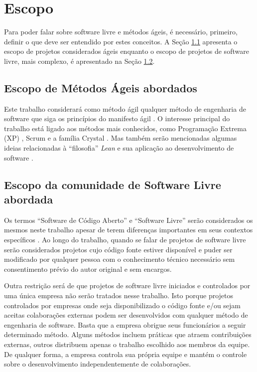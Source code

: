 \chapter{Escopo}
\label{cap:escopo}

Para poder falar sobre software livre e métodos ágeis, é necessário,
primeiro, definir o que deve ser entendido por estes conceitos. A
Seção \ref{sec:agile-def} apresenta o escopo de projetos considerados
ágeis enquanto o escopo de projetos de software livre, mais
complexo, é apresentado na Seção \ref{sec:os-def}.

\section{Escopo de Métodos Ágeis abordados}
\label{sec:agile-def}

Este trabalho considerará como método ágil qualquer método de
engenharia de software que siga os princípios do manifesto ágil
\cite{AgileManifesto}. O interesse principal do trabalho está ligado
aos métodos mais conhecidos, como Programação Extrema (XP)
\cite{XP02}, Scrum \cite{Schwaber2004} e a família Crystal
\cite{Cockburn2002}. Mas também serão mencionadas algumas ideias
relacionadas à ``filosofia'' \emph{Lean} \cite{Ohno1998} e sua
aplicação ao desenvolvimento de software \cite{Poppendieck2005}.

\section{Escopo da comunidade de Software Livre abordada}
\label{sec:os-def}

Os termos ``Software de Código Aberto'' e ``Software Livre'' serão
considerados os mesmos neste trabalho apesar de terem diferenças
importantes em seus contextos específicos \cite[Ch. 1, Free Versus
Open source]{Fogel2005}. Ao longo do trabalho, quando se falar de
projetos de software livre serão considerados projetos cujo código
fonte estiver disponível e puder ser modificado por qualquer pessoa
com o conhecimento técnico necessário sem consentimento prévio do
autor original e sem encargos.

Outra restrição será de que projetos de software livre iniciados e
controlados por uma única empresa não serão tratados nesse
trabalho. Isto porque projetos controlados por empresas onde seja
disponibilizado o código fonte e/ou sejam aceitas colaborações
externas podem ser desenvolvidos com qualquer método de engenharia de
software. Basta que a empresa obrigue seus funcionários a seguir
determinado método. Alguns métodos incluem práticas que atraem
contribuições externas, outros distribuem apenas o trabalho escolhido
aos membros da equipe. De qualquer forma, a empresa controla sua
própria equipe e mantém o controle sobre o desenvolvimento
independentemente de colaborações.


